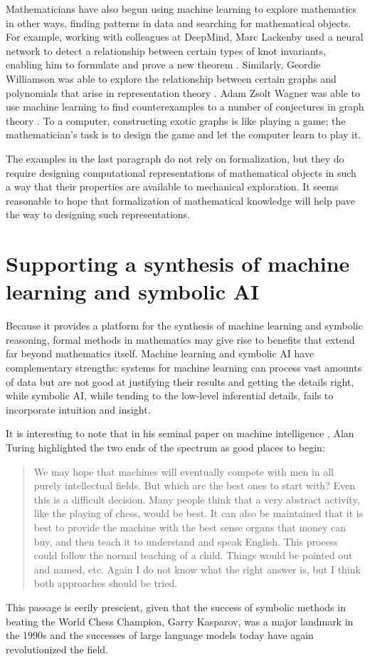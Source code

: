\documentclass{amsart}
\theoremstyle{definition}
\theoremstyle{remark}
\numberwithin{equation}{section}
\begin{document}
Mathematicians have also begun using machine learning to explore mathematics in other ways, finding patterns in data and searching for mathematical objects. For example, working with colleagues at DeepMind, Marc Lackenby used a neural network to detect a relationship between certain types of knot invariants, enabling him to formulate and prove a new theorem \cite{davies:et:al:21}. Similarly, Geordie Williamson was able to explore the relationship between certain graphs and polynomials that arise in representation theory \cite{davies:et:al:21}. Adam Zsolt Wagner was able to use machine learning to find counterexamples to a number of conjectures in graph theory \cite{wagner:21}. To a computer, constructing exotic graphs is like playing a game; the mathematician's task is to design the game and let the computer learn to play it.

The examples in the last paragraph do not rely on formalization, but they do require designing computational representations of mathematical objects in such a way that their properties are available to mechanical exploration. It seems reasonable to hope that formalization of mathematical knowledge will help pave the way to designing such representations.


\section{Supporting a synthesis of machine learning and symbolic AI}
\label{section:supporting:a:synthesis}

Because it provides a platform for the synthesis of machine learning and symbolic reasoning, formal methods in mathematics may give rise to benefits that extend far beyond mathematics itself. Machine learning and symbolic AI have complementary strengths: systems for machine learning can process vast amounts of data but are not good at justifying their results and getting the details right, while symbolic AI, while tending to the low-level inferential details, fails to incorporate intuition and insight.

It is interesting to note that in his seminal paper on machine intelligence \cite{turing:50}, Alan Turing highlighted the two ends of the spectrum as good places to begin:
\begin{quote}
We may hope that machines will eventually compete with men in all purely intellectual fields. But which are the best ones to start with? Even this is a difficult decision. Many people think that a very abstract activity, like the playing of chess, would be best. It can also be maintained that it is best to provide the machine with the best sense organs that money can buy, and then teach it to understand and speak English. This process could follow the normal teaching of a child. Things would be pointed out and named, etc. Again I do not know what the right answer is, but I think both approaches should be tried.
\end{quote}
This passage is eerily prescient, given that the success of symbolic methods in beating the World Chess Champion, Garry Kasparov, was a major landmark in the 1990s and the successes of large language models today have again revolutionized the field.
\end{document}
